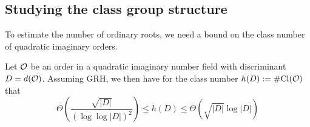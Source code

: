 \subsection{Studying the class group structure}
To estimate the number of ordinary roots, we need a bound on the class number of quadratic imaginary orders.
\begin{theorem}
    \label{prop:class_number_bounds}
    Let $\mathcal{O}$ be an order in a quadratic imaginary number field with discriminant $D = d(\mathcal{O})$.
    Assuming GRH, we then have for the class number $h(D) := \#\mathrm{Cl}(\mathcal{O})$ that
    \begin{equation*}
        \Theta\left(\frac {\sqrt{|D|}} {(\log\log|D|)^2}\right) \leq h(D) \leq \Theta\left(\sqrt{|D|} \log|D|\right)
    \end{equation*}
\end{theorem}
